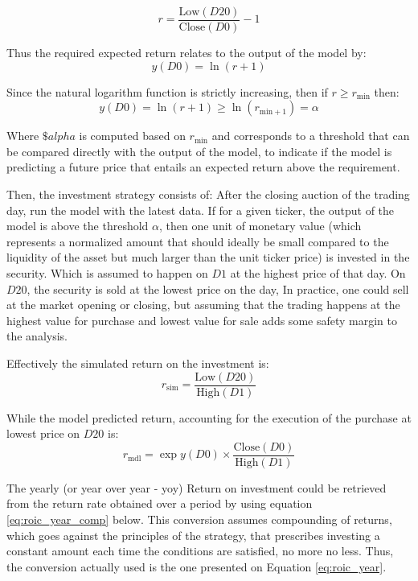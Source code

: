 \documentclass[conference]{IEEEtran}
\begin{document}
\begin{equation}
    r = \frac{\text{Low}(D20)}{\text{Close}(D0)}-1
\end{equation}

Thus the required expected return relates to the output of the model by:
\begin{equation}
    y(D0) = \ln \left(r+1\right)
\end{equation}

Since the natural logarithm function is strictly increasing, then if $r\geq r_{\text{min}}$ then:
\begin{equation}
    y(D0) = \ln {\left(r+1\right)} \geq \ln \left( r_{\text{min}+1} \right) = \alpha
\end{equation}

Where $\$alpha$ is computed based on $r_{\text{min}}$ and corresponds to a threshold that can be compared directly with the output of the model, to indicate if the model is predicting a future price that entails an expected return above the requirement.

Then, the investment strategy consists of: After the closing auction of the trading day, run the model with the latest data. If for a given ticker, the output of the model is above the threshold $\alpha$, then one unit of monetary value (which represents a normalized amount that should ideally be small compared to the liquidity of the asset but much larger than the unit ticker price) is invested in the security. Which is assumed to happen on $D1$ at the highest price of that day. On $D20$, the security is sold at the lowest price on the day, In practice, one could sell at the market opening or closing, but assuming that the trading happens at the highest value for purchase and lowest value for sale adds some safety margin to the analysis.

Effectively the simulated return on the investment is:
\begin{equation}
    r_{\text{sim}} = \frac{\text{Low}(D20)}{\text{High}(D1)}
\end{equation}

While the model predicted return, accounting for the execution of the purchase at lowest price on $D20$ is:
\begin{equation}\label{eq:pred_return}
    r_{\text{mdl}} = \exp{y(D0)} \times \frac{\text{Close}(D0)}{\text{High}(D1)}
\end{equation}

The yearly (or year over year - yoy) Return on investment could be retrieved from the return rate obtained over a period by using equation  \ref{eq:roic_year_comp} below. This conversion assumes compounding of returns, which goes against the principles of the strategy, that prescribes investing a constant amount each time the conditions are satisfied, no more no less. Thus, the conversion actually used is the one presented on Equation \ref{eq:roic_year}.
\end{document}
